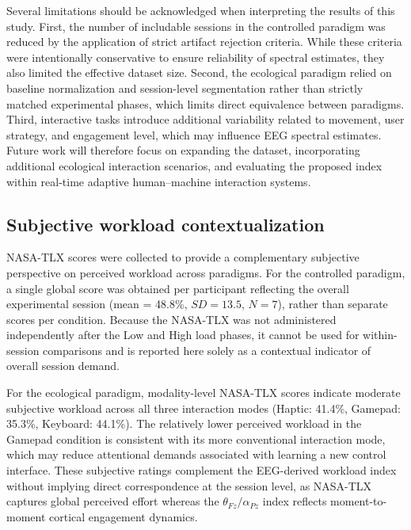 \documentclass[10pt]{iopart}
\begin{document}
Several limitations should be acknowledged when interpreting the results of this study. First, the number of includable sessions in the controlled paradigm was reduced by the application of strict artifact rejection criteria. While these criteria were intentionally conservative to ensure reliability of spectral estimates, they also limited the effective dataset size. Second, the ecological paradigm relied on baseline normalization and session-level segmentation rather than strictly matched experimental phases, which limits direct equivalence between paradigms. Third, interactive tasks introduce additional variability related to movement, user strategy, and engagement level, which may influence EEG spectral estimates. Future work will therefore focus on expanding the dataset, incorporating additional ecological interaction scenarios, and evaluating the proposed index within real-time adaptive human--machine interaction systems.

\subsection*{Subjective workload contextualization}
\label{sec:discussion_nasa}

NASA-TLX scores were collected to provide a complementary
subjective perspective on perceived workload across paradigms.
For the controlled paradigm, a single global score was obtained
per participant reflecting the overall experimental session
(mean = 48.8\%, $SD = 13.5$, $N = 7$), rather than separate
scores per condition. Because the NASA-TLX was not administered
independently after the Low and High load phases, it cannot be
used for within-session comparisons and is reported here solely
as a contextual indicator of overall session demand.

For the ecological paradigm, modality-level NASA-TLX scores
indicate moderate subjective workload across all three
interaction modes (Haptic: 41.4\%, Gamepad: 35.3\%, Keyboard:
44.1\%). The relatively lower perceived workload in the Gamepad
condition is consistent with its more conventional interaction
mode, which may reduce attentional demands associated with
learning a new control interface. These subjective ratings
complement the EEG-derived workload index without implying
direct correspondence at the session level, as NASA-TLX
captures global perceived effort whereas the
$\theta_{Fz}/\alpha_{Pz}$ index reflects moment-to-moment
cortical engagement dynamics.
\end{document}
